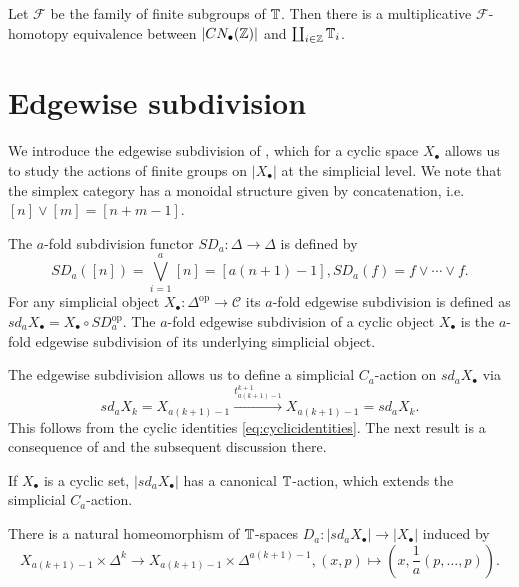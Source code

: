\begin{thm}\label{thm:cycretract}
Let $\mathcal{F}$ be the family of finite subgroups of $\mathbb{T}$. Then there is a
multiplicative $\mathcal{F}$-homotopy equivalence between
$|CN_\bullet(\mathbb{Z})|$ and $\coprod_{i\in \mathbb{Z}} \mathbb{T}_i$.
\end{thm}

\section{Edgewise subdivision}
We introduce the edgewise subdivision of \cite{bhmcyclotomic}, which for a cyclic space $X_\bullet$
allows us to study the actions of finite groups on $|X_\bullet|$
at the simplicial level. We note that the simplex category has
a monoidal structure given by concatenation, i.e. $[n]\vee [m] = [n+m-1]$.

\begin{mydef}
The $a$-fold subdivision functor $SD_a:\Delta\to \Delta$ is defined by
\[
SD_a([n]) = \bigvee_{i=1}^a [n] = [a(n+1)-1], SD_a(f) = f\vee\cdots\vee f.
\]
For any simplicial object $X_\bullet:\Delta^{\mathrm{op}}\to \mathcal{C}$
its $a$-fold edgewise subdivision is defined as $sd_aX_\bullet = X_\bullet
\circ SD_a^{\mathrm{op}}$. The  $a$-fold edgewise subdivision
of a cyclic object $X_\bullet$ is the  $a$-fold edgewise subdivision of its
underlying simplicial object. 
\end{mydef}
The edgewise subdivision allows us to define a simplicial $C_a$-action on $sd_a X_\bullet$ via 
\begin{equation}
sd_aX_k = X_{a(k+1) - 1}\xrightarrow{t_{a(k+1)-1}^{k+1}} X_{a(k+1) - 1}
=sd_aX_k.
\end{equation}
This follows from 
the cyclic identities \eqref{eq:cyclicidentities}. The next
result is a consequence of \cite[Lemma~1.6, \pno~469]{bhmcyclotomic}
and the subsequent discussion there.
\begin{lem}
If $X_\bullet$ is a cyclic set,  $|sd_aX_\bullet|$ has a canonical
$\mathbb{T}$-action, which extends the simplicial $C_a$-action.
\end{lem}


\begin{prop}\label{prop:edgewisesubdivision}
There is a natural homeomorphism of $\mathbb{T}$-spaces
$D_a:|sd_aX_\bullet|\to |X_\bullet|$ induced by
\[X_{a(k+1) -1}\times \Delta^{k}\to X_{a(k+1) -1}\times \Delta^{a(k+1)-1}, 
(x,p)\mapsto (x,\frac1a(p, \ldots, p)).\]
\end{prop}


